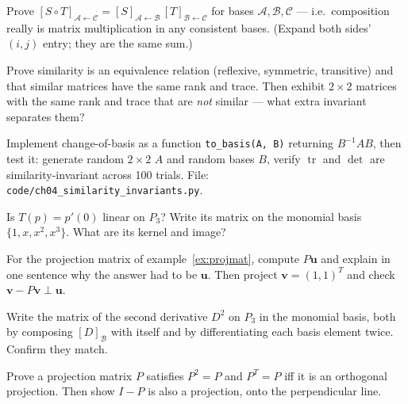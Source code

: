 \begin{exercise}[hard]
Prove $[S\circ T]_{\mathcal A\leftarrow\mathcal C}=[S]_{\mathcal A\leftarrow\mathcal B}\,[T]_{\mathcal B\leftarrow\mathcal C}$ for bases $\mathcal A,\mathcal B,\mathcal C$ — i.e.\ composition really is matrix multiplication in any consistent bases. (Expand both sides' $(i,j)$ entry; they are the same sum.)
\end{exercise}
\begin{exercise}[hard]
Prove similarity is an equivalence relation (reflexive, symmetric, transitive) and that similar matrices have the same rank and trace. Then exhibit $2\times2$ matrices with the same rank and trace that are \emph{not} similar — what extra invariant separates them?
\end{exercise}
\begin{exercise}[hard]
Implement change-of-basis as a function \texttt{to\_basis(A, B)} returning $B^{-1}AB$, then test it: generate random $2\times2$ $A$ and random bases $B$, verify $\operatorname{tr}$ and $\det$ are similarity-invariant across 100 trials. File: \texttt{code/ch04\_similarity\_invariants.py}.
\end{exercise}
\begin{exercise}[easy]
Is $T(p)=p'(0)$ linear on $P_3$? Write its matrix on the monomial basis
$\{1,x,x^2,x^3\}$. What are its kernel and image?
\end{exercise}
\begin{exercise}[medium]
For the projection matrix of example~\ref{ex:projmat}, compute
$P\mathbf{u}$ and explain in one sentence why the answer had to be
$\mathbf{u}$. Then project $\mathbf{v}=(1,1)^{T}$ and check
$\mathbf{v}-P\mathbf{v}\perp\mathbf{u}$.
\end{exercise}
\begin{exercise}[medium]
Write the matrix of the second derivative $D^2$ on $P_3$ in the
monomial basis, both by composing $[D]_{\mathcal B}$ with itself and by
differentiating each basis element twice. Confirm they match.
\end{exercise}
\begin{exercise}[hard]
Prove a projection matrix $P$ satisfies $P^2=P$ and $P^{T}=P$ iff it
is an orthogonal projection. Then show $I-P$ is also a projection, onto
the perpendicular line.
\end{exercise}
